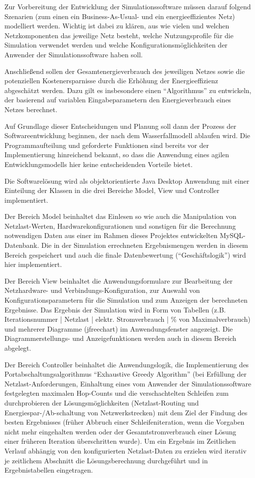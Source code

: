 Zur Vorbereitung der Entwicklung der Simulationssoftware müssen darauf folgend Szenarien (zum einen ein Business-As-Usual- und ein energieeffizientes Netz) modelliert werden. Wichtig ist dabei zu klären, aus wie vielen und welchen Netzkomponenten das jeweilige Netz besteht, welche Nutzungsprofile für die Simulation verwendet werden und welche Konfigurationsmöglichkeiten der Anwender der Simulationssoftware haben soll. 
 
Anschließend sollen der Gesamtenergieverbrauch des jeweiligen Netzes sowie die potenziellen Kostenersparnisse durch die Erhöhung der Energieeffizienz abgeschätzt werden. Dazu gilt es insbesondere einen "`Algorithmus"' zu entwickeln, der basierend auf variablen Eingabeparametern den Energieverbrauch eines Netzes berechnet. 
 
Auf Grundlage dieser Entscheidungen und Planung soll dann der Prozess der Softwareentwicklung beginnen, der nach dem Wasserfallmodell ablaufen wird. Die Programmaufteilung und geforderte Funktionen sind bereits vor der Implementierung hinreichend bekannt, so dass die Anwendung eines agilen Entwicklungsmodells hier keine entscheidenden Vorteile bietet.
 
Die Softwarelösung wird als objektorientierte Java Desktop Anwendung mit einer Einteilung der Klassen in die drei Bereiche Model, View und Controller implementiert.
 
Der Bereich Model beinhaltet das Einlesen so wie auch die Manipulation von Netzlast-Werten, Hardwarekonfigurationen und sonstigen für die Berechnung notwendigen Daten aus einer im Rahmen dieses Projektes entwickelten MySQL-Datenbank. Die in der Simulation errechneten Ergebnismengen werden in diesem Bereich gespeichert und auch die finale Datenbewertung ("`Geschäftslogik"') wird hier implementiert.
 
Der Bereich View beinhaltet die Anwendungsformulare zur Bearbeitung der Netz\-hard\-ware- und Verbindungs-Kon\-figura\-tion, zur Auswahl von Konfigurationsparametern für die Simulation und zum Anzeigen der berechneten Ergebnisse. Das Ergebnis der Simulation wird in Form von Tabellen (z.B. Iterationsnummer | Netzlast | elektr. Stromverbrauch | \% von Maximalverbrauch) und mehrerer Diagramme (jfreechart) im Anwendungsfenster angezeigt. Die Diagrammerstellungs- und Anzeigefunktionen werden auch in diesem Bereich abgelegt.
 
Der Bereich Controller beinhaltet die Anwendungslogik, die Implementierung des Portabschaltungsalgorithmus "`Exhaustive Greedy Algorithm"' (bei Erfüllung der Netzlast-Anforderungen, Einhaltung eines vom Anwender der Simulationssoftware festgelegten maximalen Hop-Counts und die verschachtelten Schleifen zum durchprobieren der Lösungs\-möglich\-keiten (Netzlast-Routing und Energiespar-/Ab-schaltung von Netzwerkstrecken) mit dem Ziel der Findung des besten Ergebnisses (früher Abbruch einer Schleifeniteration, wenn die Vorgaben nicht mehr eingehalten werden oder der Gesamtstromverbrauch einer Lösung einer früheren Iteration überschritten wurde). Um ein Ergebnis im Zeitlichen Verlauf abhängig von den konfigurierten Netzlast-Daten zu erzielen wird iterativ je zeitlichem Abschnitt die Lösungsberechnung durchgeführt und in Ergebnistabellen eingetragen.
 
